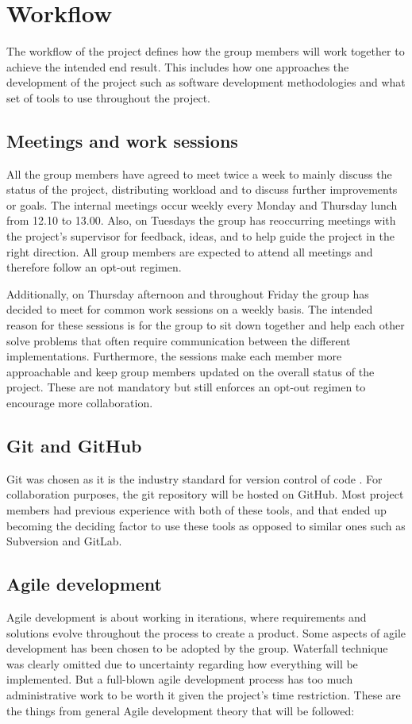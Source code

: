 \section{Workflow}

The workflow of the project defines how the group members will work together to achieve the intended end result.
This includes how one approaches the development of the project such as software development methodologies and what set of tools to use throughout the project.

\subsection{Meetings and work sessions} 
All the group members have agreed to meet twice a week to mainly discuss the status of the project, distributing workload and to discuss further improvements or goals.
The internal meetings occur weekly every Monday and Thursday lunch from 12.10 to 13.00.
Also, on Tuesdays the group has reoccurring meetings with the project's supervisor for feedback, ideas, and to help guide the project in the right direction.
All group members are expected to attend all meetings and therefore follow an opt-out regimen.

Additionally, on Thursday afternoon and throughout Friday the group has decided to meet for common work sessions on a weekly basis.
The intended reason for these sessions is for the group to sit down together and help each other solve problems that often require communication between the different implementations.
Furthermore, the sessions make each member more approachable and keep group members updated on the overall status of the project.
These are not mandatory but still enforces an opt-out regimen to encourage more collaboration.

\subsection{Git and GitHub}
Git was chosen as it is the industry standard for version control of code \cite{git_industry_standard}.
For collaboration purposes, the git repository will be hosted on GitHub.
Most project members had previous experience with both of these tools, and that ended up becoming the deciding factor to use these tools as opposed to similar ones such as Subversion and GitLab.

\subsection{Agile development}
Agile development is about working in iterations, where requirements and solutions evolve throughout the process to create a product. 
Some aspects of agile development has been chosen to be adopted by the group. 
Waterfall technique was clearly omitted due to uncertainty regarding how everything will be implemented. 
But a full-blown agile development process has too much administrative work to be worth it given the project's time restriction.
These are the things from general Agile development theory that will be followed:

